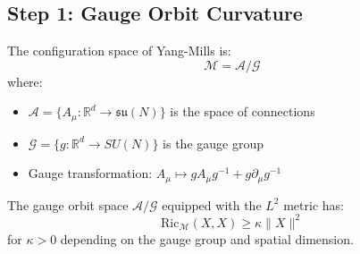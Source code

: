 \subsection{Step 1: Gauge Orbit Curvature}

\begin{definition}
\label{def:gauge-orbit}
The configuration space of Yang-Mills is:
\begin{equation}
\mathcal{M} = \mathcal{A} / \mathcal{G}
\end{equation}
where:
\begin{itemize}
\item $\mathcal{A} = \{A_\mu : \mathbb{R}^d \to \mathfrak{su}(N)\}$ is the space of connections
\item $\mathcal{G} = \{g : \mathbb{R}^d \to SU(N)\}$ is the gauge group
\item Gauge transformation: $A_\mu \mapsto g A_\mu g^{-1} + g \partial_\mu g^{-1}$
\end{itemize}
\end{definition}

\begin{theorem}
\label{thm:positive-ricci}
The gauge orbit space $\mathcal{A}/\mathcal{G}$ equipped with the $L^2$ metric has:
\begin{equation}
\mathrm{Ric}_{\mathcal{M}}(X, X) \geq \kappa \|X\|^2
\end{equation}
for $\kappa > 0$ depending on the gauge group and spatial dimension.
\end{theorem}

